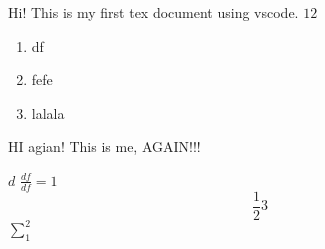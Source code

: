 \documentclass{article}
\begin{document}
\maketitle
    Hi! This is my first tex document using vscode. 
    $12$
    \begin{enumerate}
        \item df
        \item fefe  
        \item lalala
    \end{enumerate}

    \newpage
    HI agian! This is me, AGAIN!!!

    $ d $ 
    $ \frac{df}{df} = 1  $ 
    $$ \frac{1}{2} 3 $$   
    $ \sum_{1}^{2}  $ 
    
\end{document}
